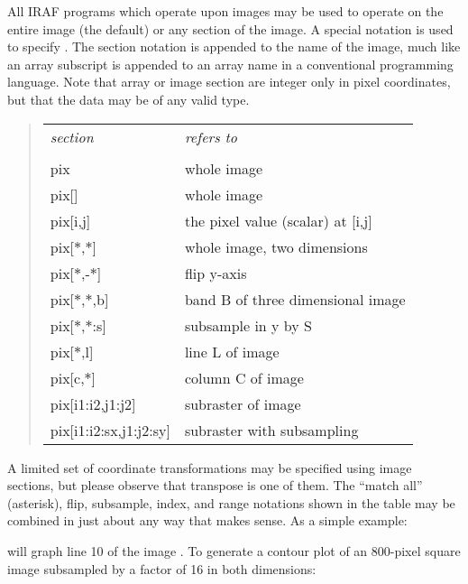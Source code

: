 \ppind
All IRAF programs which operate upon images may be used to operate on
the entire image (the default) or any section of the image.
A special notation is used to specify .  The section
notation is appended to the name of the image, much like an
array subscript is appended to an array name in a conventional programming
language. Note that array or image section  
are integer only in pixel coordinates, but that the data may be of any valid
type.

\begin{quote}
\begin{tabular}{ll}
{\it section}&   {\it refers to}\\
\\
pix&  whole image\\
pix[]&  whole image\\
pix[i,j]&       the pixel value (scalar) at [i,j]\\
pix[$*$,$*$]&       whole image, two dimensions\\
pix[$*$,-$*$]&      flip y-axis\\
pix[$*$,$*$,b]&     band B of three dimensional image\\
pix[$*$,$*$:s]&     subsample in y by S\\
pix[$*$,l]&       line L of image\\
pix[c,$*$]&       column C of image\\
pix[i1:i2,j1:j2]&       subraster of image\\
pix[i1:i2:sx,j1:j2:sy]& subraster with subsampling
\end{tabular}
\end{quote}

\noindent
A limited set of coordinate transformations may be specified using image
sections, but please observe that transpose is  one of them.
The ``match all'' (asterisk), flip, subsample, index, and range notations
shown in the table may be combined in just about any way that makes sense.
As a simple example:

\begin{quotation}\noindent
{} 
\end{quotation}

\noindent
will graph line 10 of the image .
To generate a contour plot of an 800-pixel square image
subsampled by a factor of 16 in both dimensions:

\begin{quotation}\noindent
{} 
\end{quotation}

